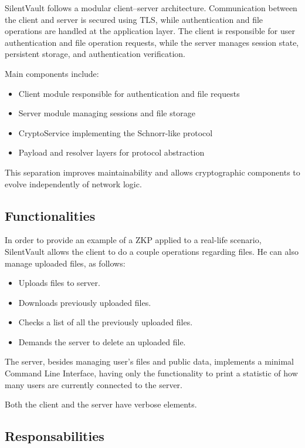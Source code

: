 \documentclass[conference]{IEEEtran}
\begin{document}
SilentVault follows a modular client--server architecture. Communication
between the client and server is secured using TLS, while authentication and file operations are handled at the application layer. The client is responsible for user authentication and file operation requests, while the server manages session state, persistent storage, and authentication verification.

Main components include:
\begin{itemize}
    \item Client module responsible for authentication and file requests
    \item Server module managing sessions and file storage
    \item CryptoService implementing the Schnorr-like protocol
    \item Payload and resolver layers for protocol abstraction
\end{itemize}

This separation improves maintainability and allows cryptographic components to evolve independently of network logic.

\subsection{Functionalities}

In order to provide an example of a ZKP applied to a real-life scenario, SilentVault allows the client to do a couple operations regarding files. He can also manage uploaded files, as follows:
\begin{itemize}
    \item Uploads files to server.
    \item Downloads previously uploaded files.
    \item Checks a list of all the previously uploaded files.
    \item Demands the server to delete an uploaded file.
\end{itemize}

The server, besides managing user's files and public data, implements a minimal Command Line Interface, having only the functionality to print a statistic of how many users are currently connected to the server.

Both the client and the server have verbose elements.

\subsection{Responsabilities}
\end{document}
